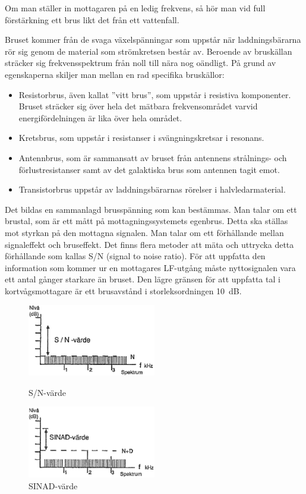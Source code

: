 Om man ställer in mottagaren på en ledig frekvens, så hör man vid full
förstärkning ett brus likt det från ett vattenfall.

Bruset kommer från de svaga växelspänningar som uppstår när
laddningsbärarna rör sig genom de material som strömkretsen består av.
Beroende av bruskällan sträcker sig frekvensspektrum från noll
till nära nog oändligt.
På grund av egenskaperna skiljer man mellan en rad specifika bruskällor:

\begin{itemize}
\item Resistorbrus, även kallat ''vitt brus'', som uppstår i resistiva
  komponenter.
  Bruset sträcker sig över hela det mätbara frekvensområdet varvid
  energifördelningen är lika över hela området.

\item Kretsbrus, som uppstår i resistanser i svängningskretsar i resonans.

\item Antennbrus, som är sammansatt av bruset från antennens
  strålnings- och förlustresistanser samt av det galaktiska brus som
  antennen tagit emot.

\item Transistorbrus uppstår av laddningsbärarnas rörelser i
  halvledarmaterial.
\end{itemize}

Det bildas en sammanlagd brusspänning som kan bestämmas.
Man talar om ett brustal, som är ett mått på mottagningssystemets egenbrus.
Detta ska ställas mot styrkan på den mottagna signalen.
Man talar om ett förhållande mellan signaleffekt och bruseffekt.
Det finns flera metoder att mäta och uttrycka detta förhållande som kallas
S/N (signal to noise ratio).
För att uppfatta den information som kommer ur en mottagares LF-utgång måste
nyttosignalen vara ett antal gånger starkare än bruset.
Den lägre gränsen för att uppfatta tal i kortvågsmottagare är ett brusavstånd
i storleksordningen 10~dB.

\begin{figure}
  \includegraphics[width=0.5\textwidth]{images/cropped_pdfs/bild_2_4-29.pdf}
  \caption{S/N-värde}
  \label{fig:bildII4-29}

  \includegraphics[width=0.5\textwidth]{images/cropped_pdfs/bild_2_4-30.pdf}
  \caption{SINAD-värde}
  \label{fig:bildII4-30}
\end{figure}

